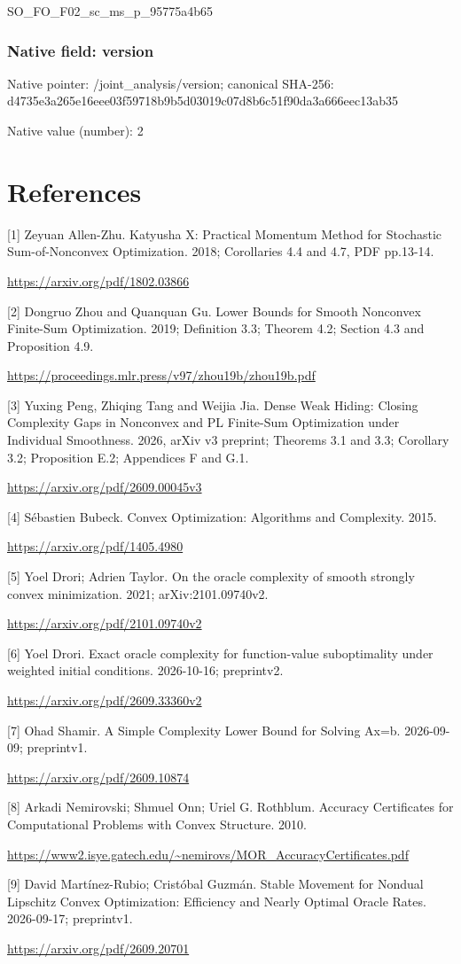 \documentclass[10pt,a4paper]{article}
\begin{document}
\begingroup\raggedright\sloppy SO\_\allowbreak{}FO\_\allowbreak{}F02\_\allowbreak{}sc\_\allowbreak{}ms\_\allowbreak{}p\_\allowbreak{}95775a4b65\par\endgroup

\subsubsection{Native field: version}
Native pointer: /joint\_\allowbreak{}analysis/version; canonical SHA-256: d4735e3a265e16eee03f59718b9b5d03019c07d8b6c51f90da3a666eec13ab35

Native value (number): 2

\section{References}
[1] Zeyuan Allen-Zhu. Katyusha X: Practical Momentum Method for Stochastic Sum-of-Nonconvex Optimization. 2018; Corollaries 4.4 and 4.7, PDF pp.13-14.

\url{https://arxiv.org/pdf/1802.03866}

[2] Dongruo Zhou and Quanquan Gu. Lower Bounds for Smooth Nonconvex Finite-Sum Optimization. 2019; Definition 3.3; Theorem 4.2; Section 4.3 and Proposition 4.9.

\url{https://proceedings.mlr.press/v97/zhou19b/zhou19b.pdf}

[3] Yuxing Peng, Zhiqing Tang and Weijia Jia. Dense Weak Hiding: Closing Complexity Gaps in Nonconvex and PL Finite-Sum Optimization under Individual Smoothness. 2026, arXiv v3 preprint; Theorems 3.1 and 3.3; Corollary 3.2; Proposition E.2; Appendices F and G.1.

\url{https://arxiv.org/pdf/2609.00045v3}

[4] Sébastien Bubeck. Convex Optimization: Algorithms and Complexity. 2015.

\url{https://arxiv.org/pdf/1405.4980}

[5] Yoel Drori; Adrien Taylor. On the oracle complexity of smooth strongly convex minimization. 2021; arXiv:2101.09740v2.

\url{https://arxiv.org/pdf/2101.09740v2}

[6] Yoel Drori. Exact oracle complexity for function-value suboptimality under weighted initial conditions. 2026-10-16; preprintv2.

\url{https://arxiv.org/pdf/2609.33360v2}

[7] Ohad Shamir. A Simple Complexity Lower Bound for Solving Ax=b. 2026-09-09; preprintv1.

\url{https://arxiv.org/pdf/2609.10874}

[8] Arkadi Nemirovski; Shmuel Onn; Uriel G. Rothblum. Accuracy Certificates for Computational Problems with Convex Structure. 2010.

\url{https://www2.isye.gatech.edu/~nemirovs/MOR_AccuracyCertificates.pdf}

[9] David Martínez-Rubio; Cristóbal Guzmán. Stable Movement for Nondual Lipschitz Convex Optimization: Efficiency and Nearly Optimal Oracle Rates. 2026-09-17; preprintv1.

\url{https://arxiv.org/pdf/2609.20701}
\end{document}
